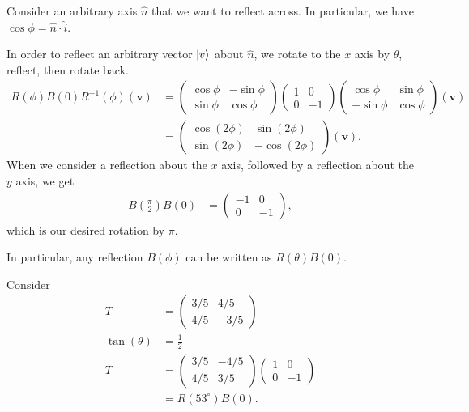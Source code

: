 \documentclass[10pt]{mypackage}
\begin{document}
\begin{example}
  Consider an arbitrary axis $\hat{n}$ that we want to reflect across. In particular, we have $\cos\phi = \hat{n}\cdot \hat{i}$.\newline

  In order to reflect an arbitrary vector $\ket{v}$ about $\hat{n}$, we rotate to the $x$ axis by $\theta$, reflect, then rotate back.
  \begin{align*}
    R\left(\phi\right) B(0) R^{-1}\left(\phi\right)\left(\mathbf{v}\right) &= \begin{pmatrix}\cos\phi & -\sin\phi \\ \sin\phi & \cos\phi\end{pmatrix} \begin{pmatrix}1 & 0 \\ 0 & -1\end{pmatrix} \begin{pmatrix}\cos\phi & \sin\phi \\ -\sin\phi & \cos\phi\end{pmatrix} \left(\mathbf{v}\right)\\
     &= \begin{pmatrix}\cos\left(2\phi\right) & \sin\left(2\phi\right) \\ \sin\left(2\phi\right) & -\cos\left(2\phi\right)\end{pmatrix} \left(\mathbf{v}\right).
  \end{align*}
  When we consider a reflection about the $x$ axis, followed by a reflection about the $y$ axis, we get
  \begin{align*}
    B\left(\frac{\pi}{2}\right) B\left(0\right) &= \begin{pmatrix}-1 & 0 \\ 0 & -1\end{pmatrix},
  \end{align*}
  which is our desired rotation by $\pi$.\newline

  In particular, any reflection $B\left(\phi\right)$ can be written as $R\left(\theta\right)B\left(0\right)$.\newline

  Consider
  \begin{align*}
    T &= \begin{pmatrix}3/5 & 4/5\\ 4/5 & -3/5\end{pmatrix}\\
    \tan\left(\theta\right) &= \frac{1}{2}\\
    T &= \begin{pmatrix}3/5 & -4/5\\4/5 & 3/5\end{pmatrix} \begin{pmatrix}1 & 0 \\ 0 & -1\end{pmatrix}\\
      &= R\left(53^{\circ}\right)B\left(0\right).
  \end{align*}
\end{example}
\end{document}

